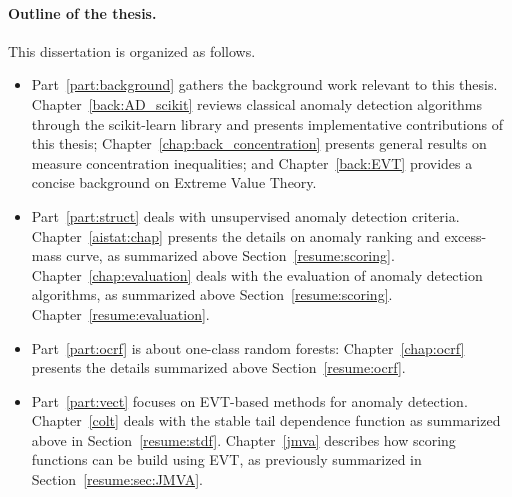 \paragraph{Outline of the thesis.}
This dissertation is organized as follows. 
\begin{itemize}
\item Part~\ref{part:background} gathers the background work relevant to this thesis.
Chapter~\ref{back:AD_scikit} reviews classical anomaly detection algorithms through the scikit-learn library and presents implementative contributions of this thesis; Chapter~\ref{chap:back_concentration} presents general results on measure concentration inequalities; and Chapter~\ref{back:EVT} provides a concise background on Extreme Value Theory.

\item Part~\ref{part:struct} deals with unsupervised anomaly detection criteria.
Chapter~\ref{aistat:chap} presents the details on anomaly ranking and excess-mass curve, as summarized above Section~\ref{resume:scoring}. Chapter~\ref{chap:evaluation} deals with the evaluation of anomaly detection algorithms, as summarized above Section~\ref{resume:scoring}. Chapter~\ref{resume:evaluation}.

\item Part~\ref{part:ocrf} is about one-class random forests: Chapter~\ref{chap:ocrf} presents the details %
  summarized above Section~\ref{resume:ocrf}.

\item Part~\ref{part:vect} focuses on EVT-based methods for anomaly detection. Chapter~\ref{colt} deals with the stable tail dependence function as summarized above in Section~\ref{resume:stdf}. Chapter~\ref{jmva} describes how scoring functions can be build using EVT, as previously summarized in Section~\ref{resume:sec:JMVA}.
\end{itemize}
